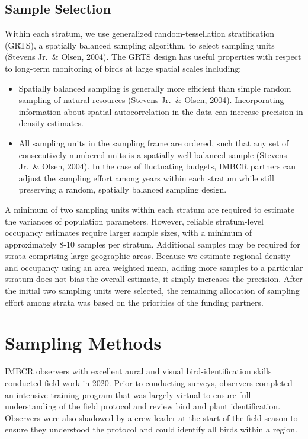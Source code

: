 \documentclass[
  letterpaper,
  DIV=11,
  numbers=noendperiod,
  oneside]{scrreprt}
\begin{document}
\hypertarget{sample-selection}{%
\subsection{Sample Selection}\label{sample-selection}}

Within each stratum, we use generalized random-tessellation
stratification (GRTS), a spatially balanced sampling algorithm, to
select sampling units (Stevens Jr.~\& Olsen, 2004). The GRTS design has
useful properties with respect to long-term monitoring of birds at large
spatial scales including:

\begin{itemize}
\item
  Spatially balanced sampling is generally more efficient than simple
  random sampling of natural resources (Stevens Jr.~\& Olsen, 2004).
  Incorporating information about spatial autocorrelation in the data
  can increase precision in density estimates.
\item
  All sampling units in the sampling frame are ordered, such that any
  set of consecutively numbered units is a spatially well-balanced
  sample (Stevens Jr.~\& Olsen, 2004). In the case of fluctuating
  budgets, IMBCR partners can adjust the sampling effort among years
  within each stratum while still preserving a random, spatially
  balanced sampling design.
\end{itemize}

A minimum of two sampling units within each stratum are required to
estimate the variances of population parameters. However, reliable
stratum-level occupancy estimates require larger sample sizes, with a
minimum of approximately 8-10 samples per stratum. Additional samples
may be required for strata comprising large geographic areas. Because we
estimate regional density and occupancy using an area weighted mean,
adding more samples to a particular stratum does not bias the overall
estimate, it simply increases the precision. After the initial two
sampling units were selected, the remaining allocation of sampling
effort among strata was based on the priorities of the funding partners.

\hypertarget{sampling-methods}{%
\section{Sampling Methods}\label{sampling-methods}}

IMBCR observers with excellent aural and visual bird-identification
skills conducted field work in 2020. Prior to conducting surveys,
observers completed an intensive training program that was largely
virtual to ensure full understanding of the field protocol and review
bird and plant identification. Observers were also shadowed by a crew
leader at the start of the field season to ensure they understood the
protocol and could identify all birds within a region.
\end{document}

